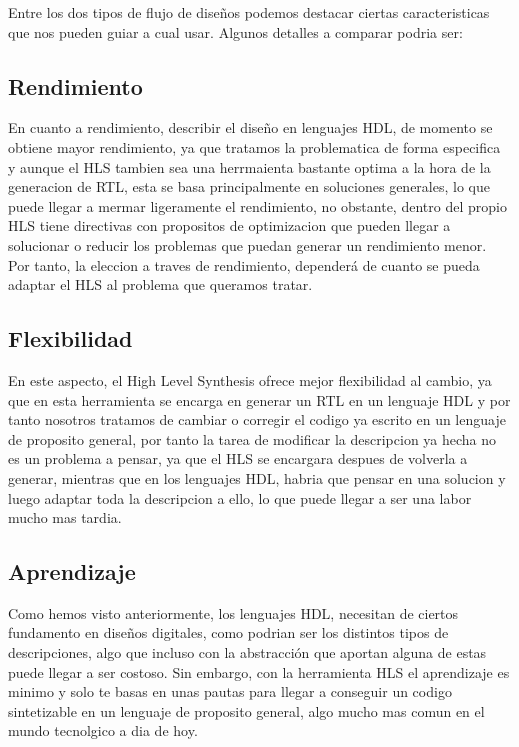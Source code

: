 \documentclass[11pt,spanish,listoffigures,listoftables]{tfgetsinf}
\begin{document}
   Entre los dos tipos de flujo de diseños podemos destacar ciertas
   caracteristicas que nos pueden guiar a cual usar. Algunos detalles a comparar
   podria ser:

   \subsection{Rendimiento}

      En cuanto a rendimiento, describir el diseño en lenguajes HDL, de momento
      se obtiene mayor rendimiento, ya que tratamos la problematica de forma
      especifica y aunque el HLS tambien sea una herrmaienta bastante optima a
      la hora de la generacion de RTL, esta se basa principalmente en soluciones
      generales, lo que puede llegar a mermar ligeramente el rendimiento, no
      obstante, dentro del propio HLS tiene directivas con propositos de
      optimizacion que pueden llegar a solucionar o reducir los problemas que
      puedan generar un rendimiento menor. Por tanto, la eleccion a traves de
      rendimiento, dependerá de cuanto se pueda adaptar el HLS al problema que
      queramos tratar.

   \subsection{Flexibilidad}

      En este aspecto, el High Level Synthesis ofrece mejor flexibilidad al
      cambio, ya que en esta herramienta se encarga en generar un RTL en un
      lenguaje HDL y por tanto nosotros tratamos de cambiar o corregir el codigo
      ya escrito en un lenguaje de proposito general, por tanto la tarea de
      modificar la descripcion ya hecha no es un problema a pensar, ya que el
      HLS se encargara despues de volverla a generar, mientras que en los
      lenguajes HDL, habria que pensar en una solucion y luego adaptar toda la
      descripcion a ello, lo que puede llegar a ser una labor mucho mas tardia.

   \subsection{Aprendizaje}

      Como hemos visto anteriormente, los lenguajes HDL, necesitan de ciertos
      fundamento en diseños digitales, como podrian ser los distintos tipos de
      descripciones, algo que incluso con la abstracción que aportan alguna de
      estas puede llegar a ser costoso. Sin embargo, con la herramienta HLS el
      aprendizaje es minimo y solo te basas en unas pautas para llegar a
      conseguir un codigo sintetizable en un lenguaje de proposito general, algo
      mucho mas comun en el mundo tecnolgico a dia de hoy.
\end{document}
